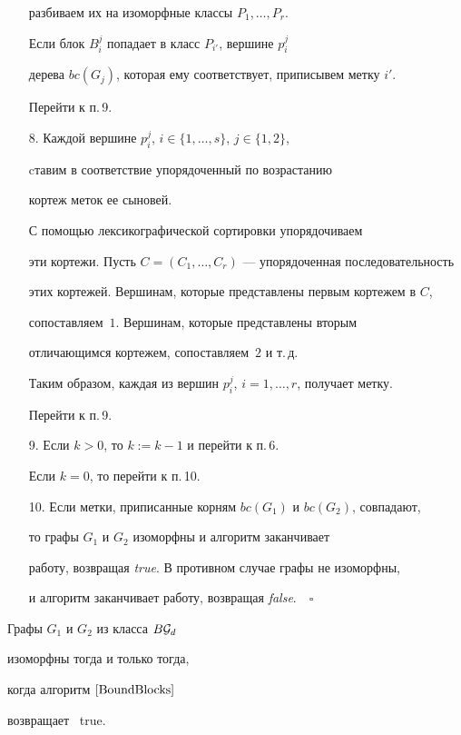 \begin{algs}
\begin{itemize}
разбиваем их на изоморфные классы $P_1,\dotsc, P_r$.


Если блок $B_i^j$ попадает в класс $P_{i'}$, вершине $p_i^j$


дерева $bc(G_j)$, которая ему соответствует, приписывем метку $i'$.


Перейти к п.\,9.


\item[8.] Каждой вершине $p_i^j$, $i\in \{1, \dotsc, s\}$, $j\in \{1, 2\}$,


cтавим в соответствие упорядоченный по возрастанию


кортеж меток ее сыновей.


С помощью лексикографической сортировки  упорядочиваем


эти кортежи. Пусть $C=(C_1,\dotsc, C_r)$ --- упорядоченная последовательность


этих кортежей. Вершинам, которые представлены первым кортежем в $C$,


сопоставляем~$1$. Вершинам, которые представлены вторым


отличающимся кортежем, сопоставляем~$2$ и т.\,д.


Таким образом, каждая из вершин $p_i^j$, $i=1,\dotsc, r$, получает метку.


Перейти к п.\,9.


\item[9.] Если $k>0$, то $k:=k-1$ и перейти к п.\,6.


Если $k=0$, то перейти к п.\,10.


\item[10.] Если метки, приписанные корням $bc(G_1)$ и $bc(G_2)$, совпадают,


то графы $G_1$ и $G_2$ изоморфны и алгоритм заканчивает


работу, возвращая {\it true}. В противном случае графы не изоморфны,


и алгоритм заканчивает работу, возвращая {\it false}.$\quad\square$


\end{itemize}


\end{algs}








\begin{thms}\label{t1BoundBlocks}


Графы $G_1$ и $G_2$ из класса $B{\cal G}_d$


изоморфны тогда и только тогда,


когда алгоритм $\ref{BoundBlocks}$


возвращает \ true.


\end{thms}





